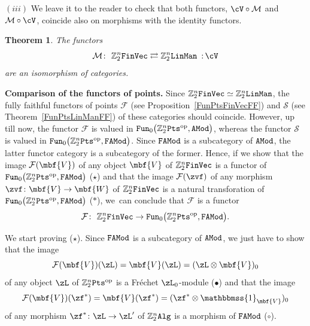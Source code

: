 \documentclass[pdftex]{sigma}%
\newcommand{\Id}{\mathbbmss{1}}
\newcommand{\op}[1]{\operatorname{#1}}
\newcommand{\Z}{{\mathbb Z}}
\def\cM{\cal M}
\def\cF{\mathcal{F}}
\def\cM{\mathcal{M}}
\newcommand{\0}{\otimes}
\newcommand{\z}{\Z_2^n}
\numberwithin{equation}{section}
\newtheorem{Theorem}{Theorem}[section]
\begin{document}
$(iii)$ We leave it to the reader to check that both functors, $\cV\circ\cM$ and $\cM\circ\cV$, coincide also on morphisms with the identity functors.

\begin{Theorem}
The functors
\[
\cM\colon\ \z{\tt FinVec}\rightleftarrows\z{\tt LinMan}\ \,{:}\, \cV
\]
are an isomorphism of categories.
\end{Theorem}

\noindent
{\bf Comparison of the functors of points.} Since $\z{\tt FinVec}\simeq\z{\tt LinMan}$, the fully faithful functors of points $\cF$ (see Proposition~\ref{FunPtsFinVecFF}) and $\mathcal{S}$ (see Theorem~\ref{FunPtsLinManFF}) of these categories should coincide. However, up till now, the functor $\cF$ is valued in ${\tt Fun}_0\big(\z{\tt Pts}^{\op{op}},{\tt AMod}\big)$, whereas the functor $\mathcal{S}$ is valued in ${\tt Fun}_0\big(\z{\tt Pts}^{\op{op}},{\tt FAMod}\big)$. Since $\tt FAMod$ is a subcategory of $\tt AMod$, the latter functor category is a subcategory of the former. Hence, if we show that the image $\cF(\mbf{V})$ of any object $\mbf{V}$ of $\z{\tt FinVec}$ is a functor of ${\tt Fun}_0\big(\z{\tt Pts}^{\op{op}},{\tt FAMod}\big)$ ($\star$) and that the image $\cF(\zvf)$ of any morphism $\zvf\colon \mbf{V}\to \mbf{W}$ of $\z{\tt FinVec}$ is a natural transforation of ${\tt Fun}_0\big(\z{\tt Pts}^{\op{op}},{\tt FAMod}\big)$ ($\ast$), we~can conclude that $\cF$ is a functor
\[
\cF\colon\ \z{\tt FinVec}\to{\tt Fun}_0\big(\z{\tt Pts}^{\op{op}},{\tt FAMod}\big).
\]

We start proving ($\star$). Since $\tt FAMod$ is a subcategory of $\tt AMod$, we just have to show that the image
\[
\cF(\mbf{V})(\zL)=\mbf{V}(\zL)=(\zL\0\mbf{V})_0
\]
of any object $\zL$ of $\z{\tt Pts}^{\op{op}}$ is a Fr\'echet $\zL_0$-module ($\bullet$) and that the image
\[
\cF(\mbf{V})(\zf^*)=\mbf{V}(\zf^*)=(\zf^*\0\Id_{\mbf{V}})_0
\]
of any morphism $\zf^*\colon \zL\to\zL'$ of $\z\tt Alg$ is a morphism of $\tt FAMod$ ($\circ$).

\newcommand{\rma}{\textrm{a}}
\newcommand{\rmv}{\textrm{v}}
\end{document}
